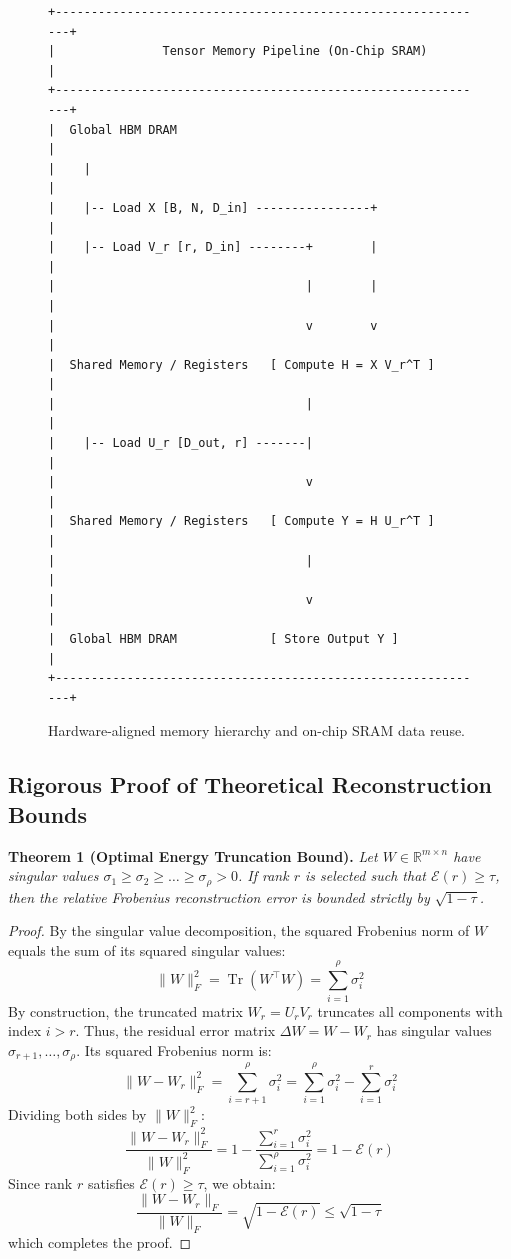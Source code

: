 \begin{figure}[H]
\centering
\begin{verbatim}
+-------------------------------------------------------------+
|               Tensor Memory Pipeline (On-Chip SRAM)         |
+-------------------------------------------------------------+
|  Global HBM DRAM                                            |
|    |                                                        |
|    |-- Load X [B, N, D_in] ----------------+                |
|    |-- Load V_r [r, D_in] --------+        |                |
|                                   |        |                |
|                                   v        v                |
|  Shared Memory / Registers   [ Compute H = X V_r^T ]        |
|                                   |                         |
|    |-- Load U_r [D_out, r] -------|                         |
|                                   v                         |
|  Shared Memory / Registers   [ Compute Y = H U_r^T ]        |
|                                   |                         |
|                                   v                         |
|  Global HBM DRAM             [ Store Output Y ]             |
+-------------------------------------------------------------+
\end{verbatim}
\caption{Hardware-aligned memory hierarchy and on-chip SRAM data reuse.}
\label{fig:memory_hierarchy}
\end{figure}

\subsection{Rigorous Proof of Theoretical Reconstruction Bounds}

\textbf{Theorem 1 (Optimal Energy Truncation Bound).} \textit{Let $W \in \mathbb{R}^{m \times n}$ have singular values $\sigma_1 \ge \sigma_2 \ge \dots \ge \sigma_{\rho} > 0$. If rank $r$ is selected such that $\mathcal{E}(r) \ge \tau$, then the relative Frobenius reconstruction error is bounded strictly by $\sqrt{1 - \tau}$.}

\begin{proof}
By the singular value decomposition, the squared Frobenius norm of $W$ equals the sum of its squared singular values:
\[
\|W\|_F^2 = \operatorname{Tr}(W^\top W) = \sum_{i=1}^{\rho} \sigma_i^2
\]
By construction, the truncated matrix $W_r = U_r V_r$ truncates all components with index $i > r$. Thus, the residual error matrix $\Delta W = W - W_r$ has singular values $\sigma_{r+1}, \dots, \sigma_{\rho}$.
Its squared Frobenius norm is:
\[
\|W - W_r\|_F^2 = \sum_{i=r+1}^{\rho} \sigma_i^2 = \sum_{i=1}^{\rho} \sigma_i^2 - \sum_{i=1}^{r} \sigma_i^2
\]
Dividing both sides by $\|W\|_F^2$:
\[
\frac{\|W - W_r\|_F^2}{\|W\|_F^2} = 1 - \frac{\sum_{i=1}^{r} \sigma_i^2}{\sum_{i=1}^{\rho} \sigma_i^2} = 1 - \mathcal{E}(r)
\]
Since rank $r$ satisfies $\mathcal{E}(r) \ge \tau$, we obtain:
\[
\frac{\|W - W_r\|_F}{\|W\|_F} = \sqrt{1 - \mathcal{E}(r)} \le \sqrt{1 - \tau}
\]
which completes the proof.
\end{proof}
